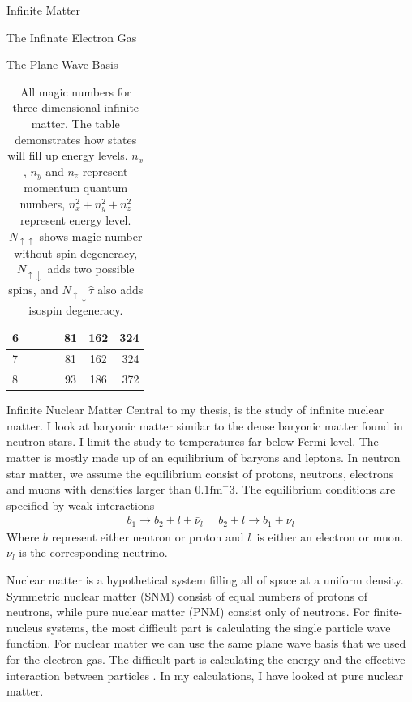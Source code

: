 \documentclass[twoside,english]{uiofysmaster}
\begin{document}
\begin{chapter}{Infinite Matter}
\begin{section}{The Infinate Electron Gas}
\begin{subsection}{The Plane Wave Basis}
\begin{table}[H]
\begin{center}
\begin{tabular}[center]{l | c c c | c | c | r }
						\hline
						6 &   &   &   & 81&162&324\\
						\hline
						7 &   &   &   & 81&162&324\\
						\hline
						8 &   &   &   & 93&186&372
					\end{tabular}
				\end{center}
				\caption{All magic numbers for three dimensional infinite matter. The table demonstrates how states will fill up energy levels. $n_x$, $n_y$ and $n_z$ represent momentum quantum numbers, $n_x^2 + n_y^2 + n_z^2$ represent energy level. $N_{\uparrow \uparrow}$ shows magic number without spin degeneracy, $N_{\uparrow \downarrow}$ adds two possible spins, and $N_{\uparrow \downarrow} \hat \tau $ also adds isospin degeneracy.} 
				\label{Magic Numbers 3d}
			\end{table}

		\end{subsection}

	\end{section}

	\begin{section}{Infinite Nuclear Matter}
		Central to my thesis, is the study of infinite nuclear matter. I look at baryonic matter similar to the dense baryonic matter found in neutron stars. I limit the study to temperatures far below Fermi level. The matter is mostly made up of an equilibrium of baryons and leptons. In neutron star matter, we assume the equilibrium consist of protons, neutrons, electrons and muons with densities larger than $0.1 \text{fm}^-3$. The equilibrium conditions are specified by weak interactions
		\begin{align}
		 	b_1 \rightarrow b_2 + l + \bar \nu_l \:\:\:\:\:\: b_2 + l \rightarrow b_1 + \nu_l
		\end{align} 
		Where $b$ represent either neutron or proton and $l$ is either an electron or muon. $\nu_l$ is the corresponding neutrino. 

		Nuclear matter is a hypothetical system filling all of space at a uniform density. Symmetric nuclear matter (SNM) consist of equal numbers of protons of neutrons, while pure nuclear matter (PNM) consist only of neutrons. For finite-nucleus systems, the most difficult part is calculating the single particle wave function. For nuclear matter we can use the same plane wave basis that we used for the electron gas. The difficult part is calculating the energy and the effective interaction between particles \cite{Day1967}. In my calculations, I have looked at pure nuclear matter. 
	\end{section}


\end{chapter}
\end{document}
